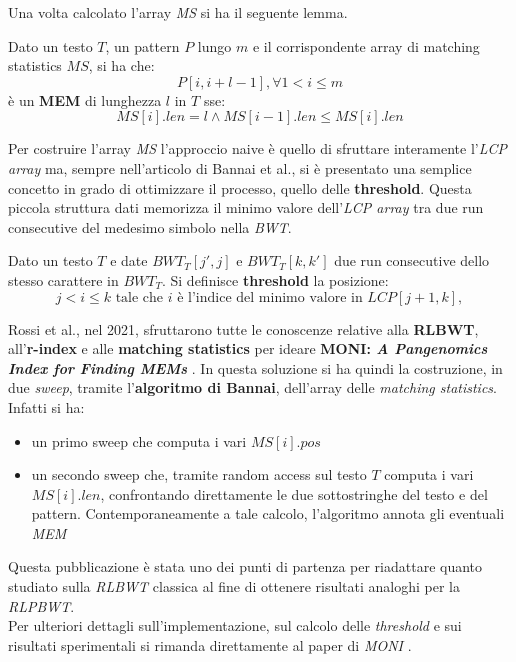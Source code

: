 \noindent
Una volta calcolato l'array \textit{MS} si ha il seguente lemma.
\begin{lemma}
  Dato un testo $T$, un pattern $P$ lungo $m$ e il
  corrispondente array di matching statistics $MS$, si ha che:
  \[P[i,i+l-1],\forall 1<i\leq m\]
  è un \textbf{MEM} di lunghezza $l$ in $T$ sse:
  \[MS[i].len=l\land MS[i-1].len\leq MS[i].len\]
\end{lemma}
Per costruire l'array \textit{MS} l'approccio naive è quello di sfruttare
interamente l'\textit{LCP array} ma, sempre nell'articolo di Bannai et
al.\cite{bannai}, si è presentato una semplice concetto in grado di
ottimizzare il processo, quello delle \textbf{threshold}. Questa piccola
struttura dati memorizza il minimo valore dell'\textit{LCP array} tra due run
consecutive del medesimo simbolo nella \textit{BWT}.
\begin{definizione}
  Dato un testo $T$ e date $BWT_T[j',j]$ e $BWT_T[k,k']$ due run consecutive
  dello stesso carattere in $BWT_T$. Si definisce \textbf{threshold} la
  posizione:
  \[j< i \leq k\mbox{ tale che } i\mbox{ è l'indice del minimo valore in
    }LCP[j+1,k],\] 
\end{definizione}
Rossi et al., nel 2021, sfruttarono tutte le conoscenze relative
alla \textbf{RLBWT}, all'\textbf{r-index} e alle \textbf{matching statistics}
per ideare \textbf{MONI:\textit{ A Pangenomics Index for Finding MEMs}}
\cite{moni}. In questa soluzione si ha quindi la costruzione, in due
\textit{sweep}, tramite l'\textbf{algoritmo di Bannai}, dell'array delle
\textit{matching statistics}. Infatti si ha:
\begin{itemize}
  \item un primo sweep che computa i vari $MS[i].pos$
  \item un secondo sweep che, tramite random access sul testo $T$ computa i
  vari $MS[i].len$, confrontando direttamente le due sottostringhe del testo e
  del pattern. Contemporaneamente a tale calcolo, l'algoritmo annota gli
  eventuali \textit{MEM}
\end{itemize}
Questa pubblicazione è stata uno dei punti di partenza per
riadattare quanto studiato sulla \textit{RLBWT} classica al fine di ottenere
risultati analoghi per la \textit{RLPBWT}.\\
Per ulteriori dettagli sull'implementazione, sul calcolo delle
\textit{threshold} e sui risultati sperimentali si rimanda direttamente al paper
di \textit{MONI} \cite{moni}.
